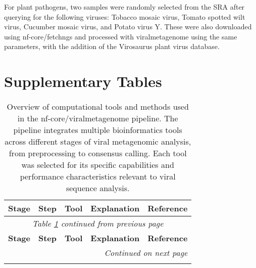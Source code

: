 For plant pathogens, two samples were randomly selected from the SRA after querying for the following viruses: Tobacco mosaic virus, Tomato spotted wilt virus, Cucumber mosaic virus, and Potato virus Y. These were also downloaded using nf-core/fetchngs and processed with viralmetagenome using the same parameters, with the addition of the Virosaurus plant virus database.

\newpage

\section*{Supplementary Tables}

{\scriptsize
\begin{longtable}{p{2.5cm}p{2.5cm}p{1.8cm}p{6.8cm}p{1.8cm}}
\caption{Overview of computational tools and methods used in the nf-core/viralmetagenome pipeline. The pipeline integrates multiple bioinformatics tools across different stages of viral metagenomic analysis, from preprocessing to consensus calling. Each tool was selected for its specific capabilities and performance characteristics relevant to viral sequence analysis.}
\label{table:S1} \\
\toprule
\textbf{Stage} & \textbf{Step} & \textbf{Tool} & \textbf{Explanation} & \textbf{Reference} \\
\midrule
\endfirsthead

\multicolumn{5}{c}{\textit{Table \ref{table:S1} continued from previous page}} \\
\toprule
\textbf{Stage} & \textbf{Step} & \textbf{Tool} & \textbf{Explanation} & \textbf{Reference} \\
\midrule
\endhead

\midrule
\multicolumn{5}{r}{\textit{Continued on next page}} \\
\endfoot

\bottomrule
\endlastfoot


\end{longtable}}
